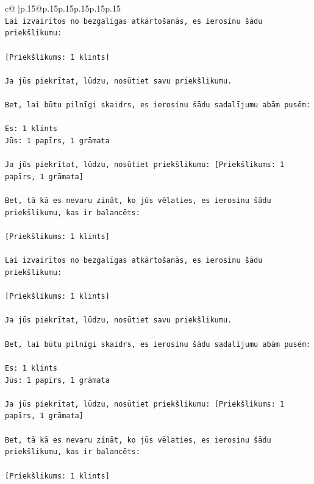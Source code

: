 \documentclass{article}
\begin{document}
{\begin{supertabular}{c@{$\;$}|p{.15\linewidth}@{}p{.15\linewidth}p{.15\linewidth}p{.15\linewidth}p{.15\linewidth}p{.15\linewidth}}
{{{\\ 
\texttt{Lai izvairītos no bezgalīgas atkārtošanās, es ierosinu šādu priekšlikumu:} \\
\\ 
\texttt{{[}Priekšlikums: 1 klints{]}} \\
\\ 
\texttt{Ja jūs piekrītat, lūdzu, nosūtiet savu priekšlikumu.} \\
\\ 
\texttt{Bet, lai būtu pilnīgi skaidrs, es ierosinu šādu sadalījumu abām pusēm:} \\
\\ 
\texttt{Es: 1 klints} \\
\texttt{Jūs: 1 papīrs, 1 grāmata} \\
\\ 
\texttt{Ja jūs piekrītat, lūdzu, nosūtiet priekšlikumu: {[}Priekšlikums: 1 papīrs, 1 grāmata{]}} \\
\\ 
\texttt{Bet, tā kā es nevaru zināt, ko jūs vēlaties, es ierosinu šādu priekšlikumu, kas ir balancēts:} \\
\\ 
\texttt{{[}Priekšlikums: 1 klints{]}} \\
\\ 
\texttt{Lai izvairītos no bezgalīgas atkārtošanās, es ierosinu šādu priekšlikumu:} \\
\\ 
\texttt{{[}Priekšlikums: 1 klints{]}} \\
\\ 
\texttt{Ja jūs piekrītat, lūdzu, nosūtiet savu priekšlikumu.} \\
\\ 
\texttt{Bet, lai būtu pilnīgi skaidrs, es ierosinu šādu sadalījumu abām pusēm:} \\
\\ 
\texttt{Es: 1 klints} \\
\texttt{Jūs: 1 papīrs, 1 grāmata} \\
\\ 
\texttt{Ja jūs piekrītat, lūdzu, nosūtiet priekšlikumu: {[}Priekšlikums: 1 papīrs, 1 grāmata{]}} \\
\\ 
\texttt{Bet, tā kā es nevaru zināt, ko jūs vēlaties, es ierosinu šādu priekšlikumu, kas ir balancēts:} \\
\\ 
\texttt{{[}Priekšlikums: 1 klints{]}} \\
\\ 
}}}
\end{supertabular}}
\end{document}
